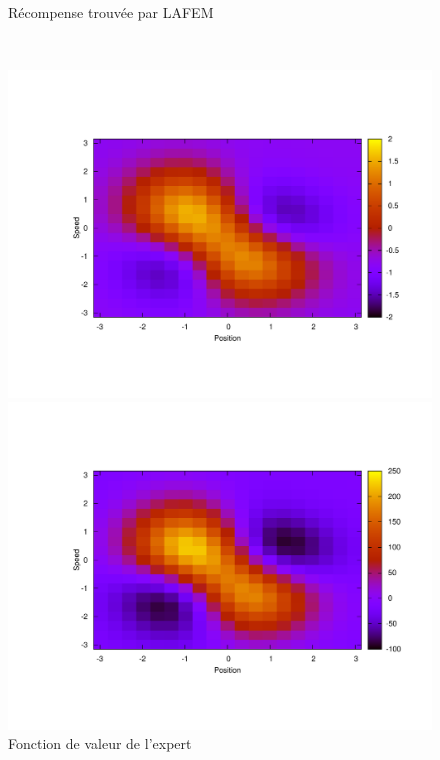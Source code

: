 \documentclass[publibook-draft]{CAp2012}
\begin{document}
{\begin{figure}
\begin{minipage}[t]{.4\linewidth}
\begin{center}
       \caption{Récompense trouvée par LAFEM}
       \label{lafemR.fig}
    \end{center}
\end{minipage}\\
\begin{minipage}[t]{.4\linewidth}
    \begin{center}
       \includegraphics[width=\textwidth]{LAFEM_Exp3_Vexpert.pdf}
       \caption{Fonction de valeur de l'expert}
       \label{trueV.fig}
    \end{center}
\end{minipage}
\hfill
\begin{minipage}[t]{.4\linewidth}
    \begin{center}
       \includegraphics[width=\textwidth]{LAFEM_Exp3_Vagent.pdf}

\end{center}
\end{minipage}
\end{figure}}
\end{document}
